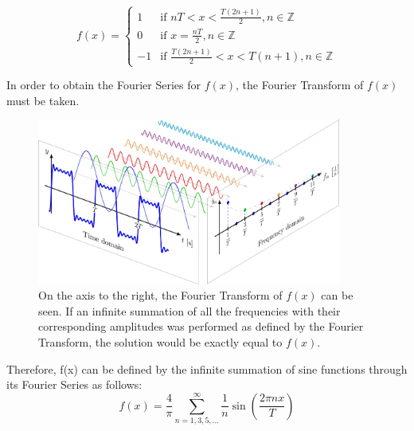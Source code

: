 \begin{equation}
f(x)=
    \begin{cases}
        1 & \text{if } nT < x < \frac{T(2n+1)}{2} , n \in \mathbb{Z}\\
        0 & \text{if } x = \frac{nT}{2} , n \in \mathbb{Z}\\
        -1 & \text{if } \frac{T(2n+1)}{2} < x < T(n+1) , n \in \mathbb{Z}
    \end{cases}
\end{equation}

In order to obtain the Fourier Series for \(f(x)\), the Fourier Transform of \(f(x)\) must be taken.

\begin{figure}[H]
    \centering
    \includegraphics[width=100mm,height=\textheight,keepaspectratio]{images/step_function_fourier_series.png}
    \caption{On the axis to the right, the Fourier Transform of \(f(x)\) can be seen. If an infinite summation of all the frequencies with their corresponding amplitudes was performed as defined by the Fourier Transform, the solution would be exactly equal to \(f(x)\).}
    \label{fig:decomposed_step_function}
\end{figure}

Therefore, f(x) can be defined by the infinite summation of sine functions through its Fourier Series as follows: 
\[f(x)=\frac{4}{\pi}\sum_{n=1,3,5,...}^{\infty} \frac{1}{n} \sin \left( \frac{2 \pi n x}{T}
 \right) \]

